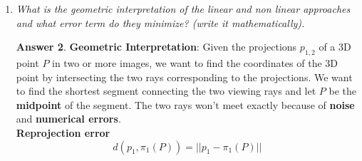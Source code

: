 \documentclass[a4paper,12 pt]{article}
\theoremstyle{definition}
\theoremstyle{remark}
\newtheorem*{bmk}{Remark}
\theoremstyle{definition}
\theoremstyle{definition}
\theoremstyle{definition}
\theoremstyle{definition}
\theoremstyle{remark}
\theoremstyle{remark}
\theoremstyle{definition}
\theoremstyle{definition}
\newtheorem*{answer}{Answer}
\begin{document}
\begin{enumerate}
\begin{enumerate}
\begin{answer}
\begin{equation}
\begin{split}
\end{split}
\end{equation}
\textbf{Triangulation: least-squares approximation}
We solve for $P$ and get a system $A\cdot \begin{pmatrix} \lambda_1 \\\lambda_2 \end{pmatrix}=b$, which cannot be inverted (A is $3\times 2$). We use pseudoinverse approximation (least squares) and get
\begin{equation}
A^T\cdot A\cdot \begin{pmatrix}
 \lambda_1\\
 \lambda_2
 \end{pmatrix}=A^T\cdot b \Rightarrow \begin{pmatrix}
 \lambda_1\\
 \lambda_2
 \end{pmatrix}=(A^T\cdot A)^{-1}\cdot A^T\cdot b.
\end{equation}
\begin{bmk}
This is a problem with 6 equations and 5 unknowns: the 3 element of the coordinates of the world point and the two depth factors $\lambda_1,\lambda_2$.
\end{bmk}

\textbf{Triangulation: Nonlinear approach}: 
We want to find $P$ that minimizes the \textbf{sum of squared reprojection error}
\begin{equation}
SSRE=d^2(p_1,\pi_1(P))+d^2(p_2,\pi_2(P)),
\end{equation}
where 
\begin{equation}
d(p_1,\pi_1(P))=||p_1-\pi_1(P)||
\end{equation}
is called \textbf{reprojection error}. The observed point is $p_1,p_2$ and the reprojected one is $M_1P,M_2P$. In practice, this is done by initializing $P$ using linear approach and then minimize SSRE using Gauss-Newton of Levenberg-Marquardt.
\end{answer}
\item \textit{What is the geometric interpretation of the linear and non linear approaches and what error term do they minimize? (write it mathematically). }
\begin{answer}
\textbf{Geometric Interpretation}:  
Given the projections $p_{1,2}$ of a 3D point $P$ in two or more images, we want to find the coordinates of the 3D point by intersecting the two rays corresponding to the projections. We want to find the shortest segment connecting the two viewing rays and let $P$ be the \textbf{midpoint} of the segment. The two rays won't meet exactly because of \textbf{noise} and \textbf{numerical errors}.\\
\textbf{Reprojection error}
\begin{equation}
d(p_1,\pi_1(P))=||p_1-\pi_1(P)||
\end{equation}


\end{answer}
\end{enumerate}
\end{enumerate}
\end{document}
